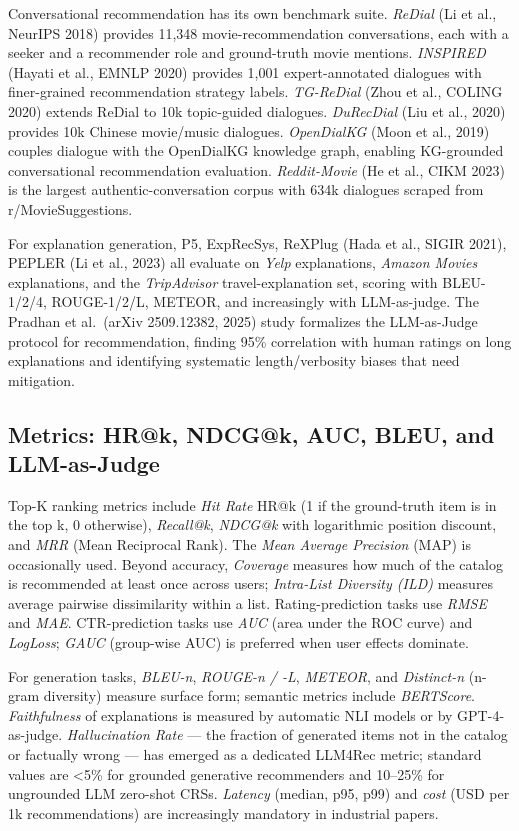 Conversational recommendation has its own benchmark suite. \emph{ReDial} (Li et al., NeurIPS 2018) provides 11,348 movie-recommendation conversations, each with a seeker and a recommender role and ground-truth movie mentions. \emph{INSPIRED} (Hayati et al., EMNLP 2020) provides 1,001 expert-annotated dialogues with finer-grained recommendation strategy labels. \emph{TG-ReDial} (Zhou et al., COLING 2020) extends ReDial to 10k topic-guided dialogues. \emph{DuRecDial} (Liu et al., 2020) provides 10k Chinese movie/music dialogues. \emph{OpenDialKG} (Moon et al., 2019) couples dialogue with the OpenDialKG knowledge graph, enabling KG-grounded conversational recommendation evaluation. \emph{Reddit-Movie} (He et al., CIKM 2023) is the largest authentic-conversation corpus with 634k dialogues scraped from r/MovieSuggestions.

For explanation generation, P5, ExpRecSys, ReXPlug (Hada et al., SIGIR 2021), PEPLER (Li et al., 2023) all evaluate on \emph{Yelp} explanations, \emph{Amazon Movies} explanations, and the \emph{TripAdvisor} travel-explanation set, scoring with BLEU-1/2/4, ROUGE-1/2/L, METEOR, and increasingly with LLM-as-judge. The Pradhan et al.~(arXiv 2509.12382, 2025) study formalizes the LLM-as-Judge protocol for recommendation, finding 95\% correlation with human ratings on long explanations and identifying systematic length/verbosity biases that need mitigation.

\subsection{Metrics: HR@k, NDCG@k, AUC, BLEU, and LLM-as-Judge}\label{metrics-hrk-ndcgk-auc-bleu-and-llm-as-judge}

Top-K ranking metrics include \emph{Hit Rate} HR@k (1 if the ground-truth item is in the top k, 0 otherwise), \emph{Recall@k}, \emph{NDCG@k} with logarithmic position discount, and \emph{MRR} (Mean Reciprocal Rank). The \emph{Mean Average Precision} (MAP) is occasionally used. Beyond accuracy, \emph{Coverage} measures how much of the catalog is recommended at least once across users; \emph{Intra-List Diversity (ILD)} measures average pairwise dissimilarity within a list. Rating-prediction tasks use \emph{RMSE} and \emph{MAE}. CTR-prediction tasks use \emph{AUC} (area under the ROC curve) and \emph{LogLoss}; \emph{GAUC} (group-wise AUC) is preferred when user effects dominate.

For generation tasks, \emph{BLEU-n}, \emph{ROUGE-n / -L}, \emph{METEOR}, and \emph{Distinct-n} (n-gram diversity) measure surface form; semantic metrics include \emph{BERTScore}. \emph{Faithfulness} of explanations is measured by automatic NLI models or by GPT-4-as-judge. \emph{Hallucination Rate} --- the fraction of generated items not in the catalog or factually wrong --- has emerged as a dedicated LLM4Rec metric; standard values are \textless5\% for grounded generative recommenders and 10--25\% for ungrounded LLM zero-shot CRSs. \emph{Latency} (median, p95, p99) and \emph{cost} (USD per 1k recommendations) are increasingly mandatory in industrial papers.

